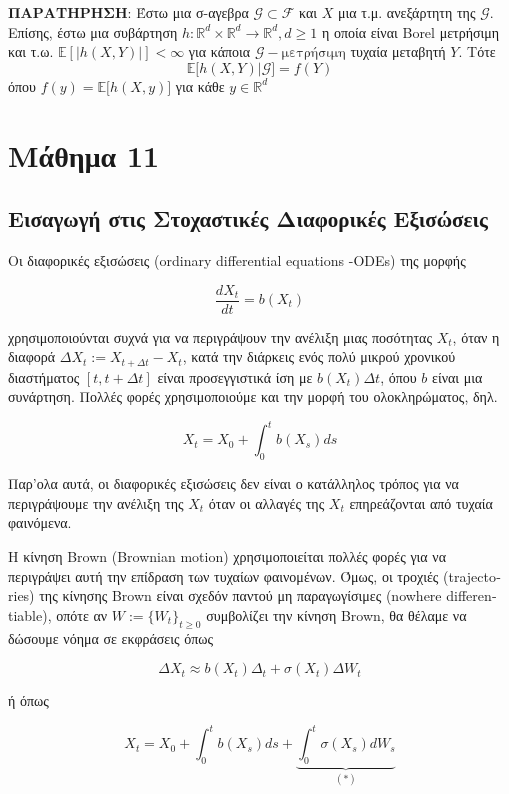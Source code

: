 \documentclass[12pt,a4paper]{article}
\theoremstyle{definition}
\numberwithin{equation}{section}
\begin{document}
\textbf{ΠΑΡΑΤΗΡΗΣΗ}: Έστω μια σ-αγεβρα \(\mathcal{G}\subset \mathcal{F}\) και \(X\) μια τ.μ. ανεξάρτητη της \(\mathcal{G}\). Επίσης, έστω μια συβάρτηση \(h: \mathbb{R}^d \times \mathbb{R}^d \rightarrow \mathbb{R}^d, d \geq 1\) η οποία είναι
\textlatin{Borel} μετρήσιμη και τ.ω. \(\mathbb{E}[|h(X,Y)|] < \infty\) για κάποια \(\mathcal{G}-\text{μετρήσιμη}\) τυχαία μεταβητή \(Y\). Τότε
$$ \mathbb{E}\big[ h(X,Y) | \mathcal{G} \big]  = f(Y)$$
όπου \(f(y) = \mathbb{E}\big[h(X,y)\big]\) για κάθε \(y \in \mathbb{R}^d\)

\pagebreak

\section{Μάθημα 11}
\label{sec:orgfe82158}
\subsection{Εισαγωγή στις Στοχαστικές Διαφορικές Εξισώσεις}
\label{sec:orged6b2e5}

Οι διαφορικές εξισώσεις \textlatin{(ordinary differential equations -ODEs)} της μορφής

$$ \frac{dX_t}{dt} = b(X_t) $$

χρησιμοποιούνται συχνά για να περιγράψουν την ανέλιξη μιας ποσότητας \(X_t\), όταν η διαφορά \(\Delta X_t := X_{t+\Delta t} - X_t\), κατά την διάρκεις ενός πολύ μικρού χρονικού διαστήματος \([t, t+\Delta t]\) είναι προσεγγιστικά ίση με \(b(X_t)\Delta t\), όπου \(b\) είναι μια συνάρτηση. Πολλές φορές χρησιμοποιούμε και
την μορφή του ολοκληρώματος, δηλ.

$$ X_t = X_0 + \int_0^t b(X_s)ds $$

Παρ'ολα αυτά, οι διαφορικές εξισώσεις δεν είναι ο κατάλληλος τρόπος για να περιγράψουμε την ανέλιξη της \(X_t\) όταν οι αλλαγές της \(X_t\)
επηρεάζονται από τυχαία φαινόμενα.

Η κίνηση \textlatin{Brown (Brownian motion)} χρησιμοποιείται πολλές φορές για να περιγράψει αυτή την επίδραση των τυχαίων φαινομένων.
Όμως, οι τροχιές \textlatin{(trajectories)} της κίνησης \textlatin{Brown} είναι σχεδόν παντού μη παραγωγίσιμες \textlatin{(nowhere differentiable)}, οπότε αν \(W:= \{W_t\}_{t\geq 0}\) συμβολίζει την κίνηση \textlatin{Brown}, θα θέλαμε να δώσουμε νόημα σε εκφράσεις
όπως

$$ \Delta X_t \approx b(X_t) \Delta_t + \sigma (X_t) \Delta W_t$$

ή όπως

$$X_t = X_0 + \int_0^t b(X_s) ds + \underbrace{\int_0^t \sigma(X_s) dW_s}_{(*)} $$
\end{document}
